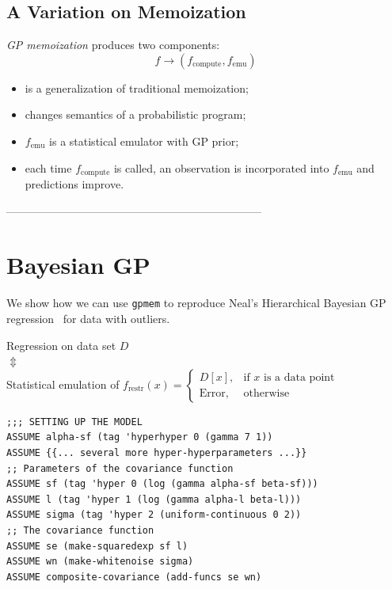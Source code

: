 \documentclass[a0,portrait]{a0poster}
\newcommand{\compute}{{\textrm{compute}}}
\newcommand{\emu}{{\textrm{emu}}}
\newcommand{\restr}{{\textrm{restr}}}
\begin{document}
\begin{multicols}{3}
\subsection*{A Variation on Memoization}
{\em GP memoization} produces two components:
\[ f \to (f_\compute, f_\emu) \]
\begin{itemize}
\setlength{\itemindent}{1cm}
 \item is a generalization of traditional memoization;
 \item changes semantics of a probabilistic program;
 \item $f_\emu$ is a statistical emulator with GP prior;
 \item each time $f_\compute$ is called, an observation is incorporated into $f_\emu$ and predictions improve.
\end{itemize}


---------------------------------------------------------------------


\section*{Bayesian GP}

We show how we can use  {\tt gpmem} to reproduce Neal's Hierarchical Bayesian GP regression~\cite{neal1997monte} for data with outliers.

\begin{center}
Regression on data set $D$ \\
$\Updownarrow$ \\
Statistical emulation of $f_\restr(x) = \begin{cases}
      D[x], & \text{if $x$ is a data point} \\
      \text{Error}, & \text{otherwise}
    \end{cases}$
\end{center}
\begin{minipage}{\linewidth}
\belowcaptionskip=-10pt
\begin{lstlisting}[frame=single,caption=Hierarchical  GP Smoothing,mathescape,label=alg:gphierarch]
;;; SETTING UP THE MODEL
ASSUME alpha-sf (tag 'hyperhyper 0 (gamma 7 1))
ASSUME {{... several more hyper-hyperparameters ...}}
;; Parameters of the covariance function
ASSUME sf (tag 'hyper 0 (log (gamma alpha-sf beta-sf)))
ASSUME l (tag 'hyper 1 (log (gamma alpha-l beta-l)))
ASSUME sigma (tag 'hyper 2 (uniform-continuous 0 2))
;; The covariance function
ASSUME se (make-squaredexp sf l)
ASSUME wn (make-whitenoise sigma)
ASSUME composite-covariance (add-funcs se wn)


\end{lstlisting}
\end{minipage}
\end{multicols}
\end{document}
